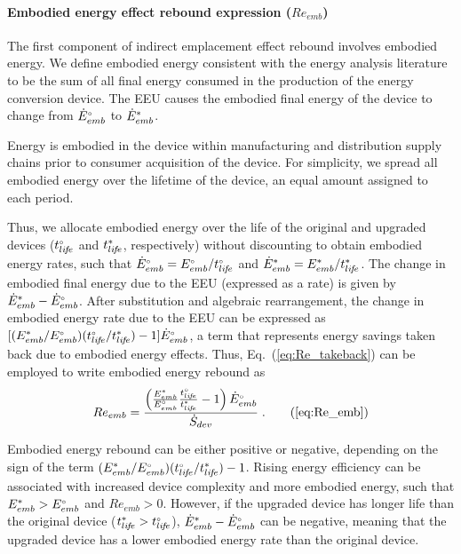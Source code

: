 \paragraph{Embodied energy effect rebound expression ($Re_{emb}$)}
\label{sec:Re_emb}

The first component of indirect emplacement effect rebound
involves embodied energy.
We define embodied energy consistent with the energy analysis literature
to be the sum of all final energy consumed
in the production of the energy conversion device.
The EEU
causes the embodied final energy of the device to change
from ${}{\dot{E}}^{\scriptscriptstyle \circ}_{emb}$ to ${\dot{E}}^*_{emb}$.

Energy is embodied in the device within manufacturing and distribution supply chains
prior to consumer acquisition of the device.
For simplicity, we spread all embodied energy
over the lifetime of the device,
an equal amount assigned to each period.

Thus, we allocate embodied energy over the life of the original and upgraded devices
(${}{t}^{\scriptscriptstyle \circ}_{li\!f\!e}$ and ${t}^*_{li\!f\!e}$, respectively)
without discounting
to obtain embodied energy rates, such that
${}{\dot{E}}^{\scriptscriptstyle \circ}_{emb} = {}{E}^{\scriptscriptstyle \circ}_{emb} / {}{t}^{\scriptscriptstyle \circ}_{li\!f\!e}$
and 
${\dot{E}}^*_{emb} = {E}^*_{emb} / {t}^*_{li\!f\!e}$.
The change in embodied final energy due to the EEU (expressed as a rate) is given by
${\dot{E}}^*_{emb} - {}{\dot{E}}^{\scriptscriptstyle \circ}_{emb}$.
After substitution and algebraic rearrangement,
the change in embodied energy rate due to the EEU can be expressed as
$[ ({E}^*_{emb}/{}{E}^{\scriptscriptstyle \circ}_{emb})({}{t}^{\scriptscriptstyle \circ}_{li\!f\!e}/{t}^*_{li\!f\!e}) - 1 ] {}{\dot{E}}^{\scriptscriptstyle \circ}_{emb}$, 
a term that represents energy savings taken back due to embodied energy effects.
Thus, Eq.~(\ref{eq:Re_takeback}) can be employed to write embodied energy rebound as
%
\begin{equation} 
  Re_{emb} = \Reembeqn{} \; . \tag{\ref{eq:Re_emb}}
\end{equation}

Embodied energy rebound can be either positive or negative, depending on 
the sign of the term
$({E}^*_{emb}/{}{E}^{\scriptscriptstyle \circ}_{emb})({}{t}^{\scriptscriptstyle \circ}_{li\!f\!e}/{t}^*_{li\!f\!e}) - 1$.
Rising energy efficiency can be associated with increased device complexity
and more embodied energy,
such that ${E}^*_{emb} > {}{E}^{\scriptscriptstyle \circ}_{emb}$ and $Re_{emb} > 0$.
However, if the upgraded device has longer life than the original device
(${t}^*_{li\!f\!e} > {}{t}^{\scriptscriptstyle \circ}_{li\!f\!e}$),
${\dot{E}}^*_{emb} - {}{\dot{E}}^{\scriptscriptstyle \circ}_{emb}$ can be negative,
meaning that the upgraded device has a lower embodied energy rate than the original device.



